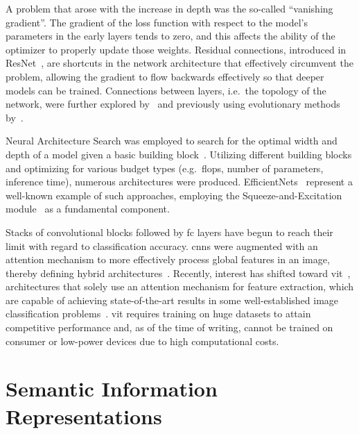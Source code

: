 A problem that arose with the increase in depth was the so-called ``vanishing gradient''. The gradient of the loss function with respect to the model's parameters in the early layers tends to zero, and this affects the ability of the optimizer to properly update those weights.
Residual connections, introduced in ResNet~\cite{DeepResidualLHeKa2015, IdentityMappinHeKa2016}, are shortcuts in the network architecture that effectively circumvent the problem, allowing the gradient to flow backwards effectively so that deeper models can be trained.
Connections between layers, i.e.\ the topology of the network, were further explored by~\cite{DualPathNetwoChen2017, DenselyConnectHuang2016} and previously using evolutionary methods by~\cite{DesigningNeuraMiller1989, EvolvingNeuralStanle2002}.

Neural Architecture Search was employed to search for the optimal width and depth of a model given a basic building block~\cite{ProgressiveNeuLiuC2017, GeneticCnnXieL2017, LargeScaleEvoReal2017, RegularizedEvoReal2018}. Utilizing different building blocks and optimizing for various budget types (e.g.~\acrshort{flops}, number of parameters, inference time), numerous architectures were produced.
EfficientNets~\cite{EfficientnetRTanM2019, Efficientnetv2TanM2021} represent a well-known example of such approaches, employing the Squeeze-and-Excitation module~\cite{SqueezeAndExcHuJi2017} as a fundamental component.

Stacks of convolutional blocks followed by \acrfull{fc} layers have begun to reach their limit with regard to classification accuracy. \acrshort{cnn}s were augmented with an attention mechanism to more effectively process global features in an image, thereby defining hybrid architectures~\cite{SpatialTransfoJaderb2015, LookAndThinkCaoC2015, ShowAttendAnXuKe2015, ScaCnnSpatiaChen2016}.
Recently, interest has shifted toward \acrfull{vit}~\cite{AnImageIsWorDosovi2020}, architectures that solely use an attention mechanism for feature extraction, which are capable of achieving state-of-the-art results in some well-established image classification problems~\cite{TransformersInKhan2021, ASurveyOnVisHanK2023}. \acrshort{vit} requires training on huge datasets to attain competitive performance and, as of the time of writing, cannot be trained on consumer or low-power devices due to high computational costs.

\section{Semantic Information Representations}
\label{sec:semantic-information-sources}


